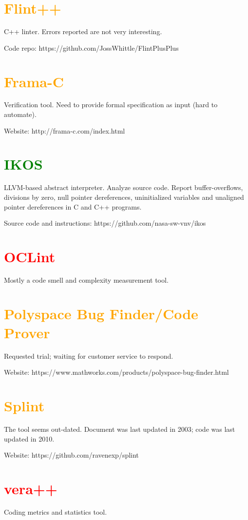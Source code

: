 \documentclass[10pt,letterpaper]{article}
\begin{document}
\section{\textcolor{orange}{Flint++}}

C++ linter. Errors reported are not very interesting.

Code repo: https://github.com/JossWhittle/FlintPlusPlus

\section{\textcolor{orange}{Frama-C}}

Verification tool. Need to provide formal specification as input (hard to automate).

Website: http://frama-c.com/index.html

\section{\textcolor{green}{IKOS}}

LLVM-based abstract interpreter. Analyze source code.
Report buffer-overflows, divisions by zero, null pointer dereferences,
uninitialized variables and unaligned pointer dereferences in C and C++ programs.

Source code and instructions: https://github.com/nasa-sw-vnv/ikos

\section{\textcolor{red}{OCLint}}

Mostly a code smell and complexity measurement tool. 

\section{\textcolor{orange}{Polyspace Bug Finder/Code Prover}}

Requested trial; waiting for customer service to respond.

Website: https://www.mathworks.com/products/polyspace-bug-finder.html

\section{\textcolor{orange}{Splint}}

The tool seems out-dated. Document was last updated in 2003; code was last updated in 2010.

Website: https://github.com/ravenexp/splint

\section{\textcolor{red}{vera++}}

Coding metrics and statistics tool.
\end{document}
